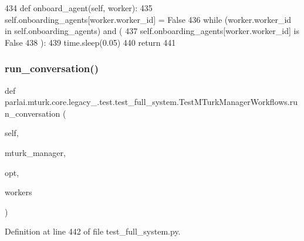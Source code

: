 \begin{DoxyCode}
434     \textcolor{keyword}{def }onboard\_agent(self, worker):
435         self.onboarding\_agents[worker.worker\_id] = \textcolor{keyword}{False}
436         \textcolor{keywordflow}{while} (worker.worker\_id \textcolor{keywordflow}{in} self.onboarding\_agents) \textcolor{keywordflow}{and} (
437             self.onboarding\_agents[worker.worker\_id] \textcolor{keywordflow}{is} \textcolor{keyword}{False}
438         ):
439             time.sleep(0.05)
440         \textcolor{keywordflow}{return}
441 
\end{DoxyCode}
\mbox{\label{classparlai_1_1mturk_1_1core_1_1legacy__2018_1_1test_1_1test__full__system_1_1TestMTurkManagerWorkflows_a0441bae10079f6823a36126581caba48}} 
\subsubsection{\texorpdfstring{run\+\_\+conversation()}{run\_conversation()}}
{\footnotesize\ttfamily def parlai.\+mturk.\+core.\+legacy\+\_.\+test.\+test\+\_\+full\+\_\+system.\+Test\+M\+Turk\+Manager\+Workflows.\+run\+\_\+conversation (\begin{DoxyParamCaption}\item[{}]{self,  }\item[{}]{mturk\+\_\+manager,  }\item[{}]{opt,  }\item[{}]{workers }\end{DoxyParamCaption})}



Definition at line 442 of file test\+\_\+full\+\_\+system.\+py.


